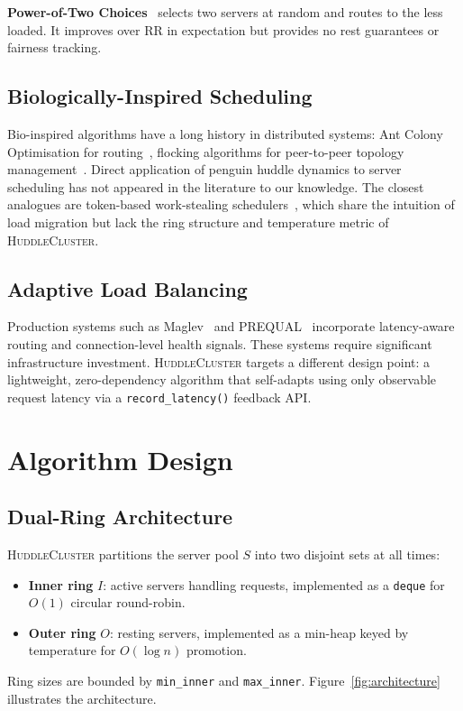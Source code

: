 \documentclass[10pt,twocolumn]{article}
\begin{document}
\textbf{Power-of-Two Choices}~\cite{mitzenmacher2001} selects two servers
at random and routes to the less loaded.
It improves over RR in expectation but provides no rest guarantees or
fairness tracking.

\subsection{Biologically-Inspired Scheduling}

Bio-inspired algorithms have a long history in distributed systems: Ant
Colony Optimisation for routing~\cite{dorigo1997}, flocking algorithms
for peer-to-peer topology management~\cite{reynolds1987}.
Direct application of penguin huddle dynamics to server scheduling has
not appeared in the literature to our knowledge.
The closest analogues are token-based work-stealing schedulers~\cite{blumofe1999},
which share the intuition of load migration but lack the ring structure
and temperature metric of \textsc{HuddleCluster}.

\subsection{Adaptive Load Balancing}

Production systems such as Maglev~\cite{eisenbud2016} and
PREQUAL~\cite{suresh2023} incorporate latency-aware routing and
connection-level health signals.
These systems require significant infrastructure investment.
\textsc{HuddleCluster} targets a different design point: a lightweight,
zero-dependency algorithm that self-adapts using only observable request
latency via a \texttt{record\_latency()} feedback API.

\section{Algorithm Design}
\label{sec:design}

\subsection{Dual-Ring Architecture}

\textsc{HuddleCluster} partitions the server pool $S$ into two disjoint
sets at all times:
\begin{itemize}
\item \textbf{Inner ring} $I$: active servers handling requests,
      implemented as a \texttt{deque} for $O(1)$ circular round-robin.
\item \textbf{Outer ring} $O$: resting servers, implemented as a
      min-heap keyed by temperature for $O(\log n)$ promotion.
\end{itemize}
Ring sizes are bounded by \texttt{min\_inner} and \texttt{max\_inner}.
Figure~\ref{fig:architecture} illustrates the architecture.
\end{document}
